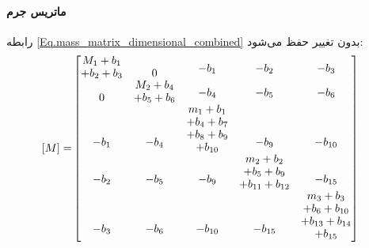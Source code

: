\paragraph{ماتریس جرم}
رابطه \eqref{Eq.mass_matrix_dimensional_combined} بدون تغییر حفظ می‌شود:
\begin{equation}\label{Eq.mass_matrix_dimensional_combined}
\begin{aligned}
[M] = &
\begin{bmatrix}
\shortstack[c]{$M_1 + b_1$ \\ $+ b_2 + b_3$} & 0 & \shortstack[c]{$-b_1$ \\ \,} & \shortstack[c]{$-b_2$ \\ \,} & \shortstack[c]{$-b_3$ \\ \,} \\
0 & \shortstack[c]{$M_2 + b_4$ \\ $+ b_5 + b_6$} & \shortstack[c]{$-b_4$ \\ \,} & \shortstack[c]{$-b_5$ \\ \,} & \shortstack[c]{$-b_6$ \\ \,} \\
\shortstack[c]{$-b_1$ \\ \,} & \shortstack[c]{$-b_4$ \\ \,} & \shortstack[c]{$m_1 + b_1$ \\ $+ b_4 + b_7$ \\ $+ b_8 + b_9$ \\ $+ b_{10}$} & \shortstack[c]{$-b_9$ \\ \,} & \shortstack[c]{$-b_{10}$ \\ \,} \\
\shortstack[c]{$-b_2$ \\ \,} & \shortstack[c]{$-b_5$ \\ \,} & \shortstack[c]{$-b_9$ \\ \,} & \shortstack[c]{$m_2 + b_2$ \\ $+ b_5 + b_9$ \\ $+ b_{11} + b_{12}$} & \shortstack[c]{$-b_{15}$ \\ \,} \\
\shortstack[c]{$-b_3$ \\ \,} & \shortstack[c]{$-b_6$ \\ \,} & \shortstack[c]{$-b_{10}$ \\ \,} & \shortstack[c]{$-b_{15}$ \\ \,} & \shortstack[c]{$m_3 + b_3$ \\ $+ b_6 + b_{10}$ \\ $+ b_{13} + b_{14}$ \\ $+ b_{15}$}
\end{bmatrix}
\end{aligned}
\end{equation}


